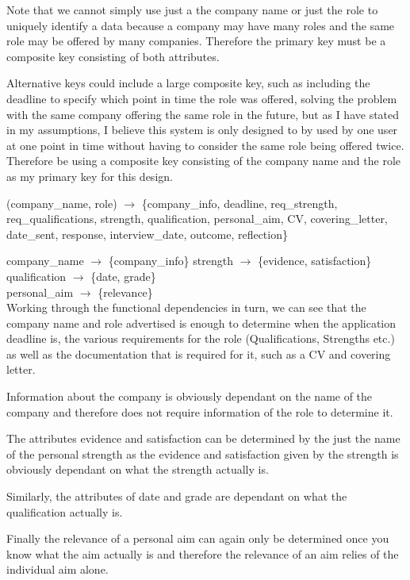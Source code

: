 \documentclass{article}
\begin{document}
Note that we cannot simply use just a the company name or just the role to uniquely identify a data because a company may have many roles and the same role may be offered by many companies. Therefore the primary key must be a composite key consisting of both attributes. 

Alternative keys could include a large composite key, such as including the deadline to specify which point in time the role was offered, solving the problem with the same company offering the same role in the future, but as I have stated in my assumptions, I believe this system is only designed to by used by one user at one point in time without having to consider the same role being offered twice. Therefore be using a composite key consisting of the company name and the role as my primary key for this design.

(company\_name, role) $\rightarrow$ \{company\_info, deadline, req\_strength, req\_qualifications, strength, qualification, personal\_aim, CV, covering\_letter, date\_sent, response, interview\_date, outcome, reflection\}

company\_name $\rightarrow$ \{company\_info\}
strength $\rightarrow$ \{evidence, satisfaction\}\\
qualification $\rightarrow$ \{date, grade\}\\
personal\_aim $\rightarrow$ \{relevance\}\\

Working through the functional dependencies in turn, we can see that the company name and role advertised is enough to determine when the application deadline is, the various requirements for the role (Qualifications, Strengths etc.) as well as the documentation that is required for it, such as a CV and covering letter. 

Information about the company is obviously dependant on the name of the company and therefore does not require information of the role to determine it.

The attributes evidence and satisfaction can be determined by the just the name of the personal strength as the evidence and satisfaction given by the strength is obviously dependant on what the strength actually is.

Similarly, the attributes of date and grade are dependant on what the qualification actually is.

Finally the relevance of a personal aim can again only be determined once you know what the aim actually is and therefore the relevance of an aim relies of the individual aim alone.
\end{document}
